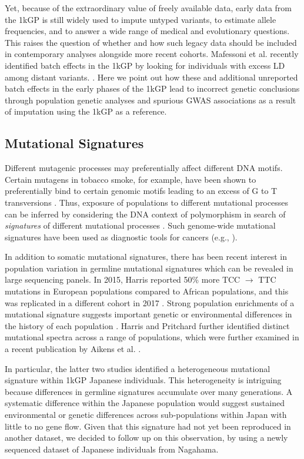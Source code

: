 \documentclass[9pt,article]{template}
\begin{document}
Yet, because of the extraordinary value of freely available data, early data from the 1kGP is still widely used to impute untyped variants, to estimate allele frequencies, and to answer a wide range of medical and evolutionary questions.
This raises the question of whether and how such legacy data should be included in contemporary analyses alongside more recent cohorts.
Mafessoni et al. recently identified batch effects in the 1kGP by looking for individuals with excess LD among distant variants. \citep{mafessoni2018turning}.
Here we point out how these and additional unreported batch effects in the early phases of the 1kGP lead to incorrect genetic conclusions through population genetic analyses and spurious GWAS associations as a result of imputation using the 1kGP as a reference.

\subsection{Mutational Signatures}

Different mutagenic processes may preferentially affect different DNA motifs. 
Certain mutagens in tobacco smoke, for example, have been shown to preferentially bind to certain genomic motifs leading to an excess of G to T transversions \citep{Pfeifer2002,Pleasance2010}. 
Thus, exposure of populations to different mutational processes can be inferred by considering the DNA context of polymorphism in search of \textit{signatures} of different mutational processes \citep{Alexandrov2013,Shiraishi2015a}. 
Such genome-wide mutational signatures have been used as diagnostic tools for cancers (e.g., \cite{Alexandrov2013,Shiraishi2015a}).

In addition to somatic mutational signatures, there has been recent interest in population variation in germline mutational signatures which can be revealed in large sequencing panels. 
In 2015, Harris reported 50\% more TCC ${\rightarrow}$ TTC mutations in European populations compared to African populations, and this was replicated in a different cohort in 2017 \citep{Harris2015a, Harris2017a, Mathieson2017a}. 
Strong population enrichments of a mutational signature suggests important genetic or environmental differences in the history of each population \citep{Harris2015a, Harris2017a}. 
Harris and Pritchard further identified distinct mutational spectra across a range of populations, which were further examined in a recent publication by Aikens et al. \citep{Harris2017a,Aikens2018}.
 
In particular, the latter two studies  identified a heterogeneous mutational signature within 1kGP Japanese individuals.
This heterogeneity is intriguing because differences in germline signatures accumulate over many generations.
A systematic difference within the Japanese population would suggest sustained environmental or genetic differences across sub-populations within Japan with little to no gene flow.
Given that this signature had not yet been reproduced in another dataset, we decided to follow up on this observation, by using a newly sequenced dataset of Japanese individuals from Nagahama.
\end{document}
